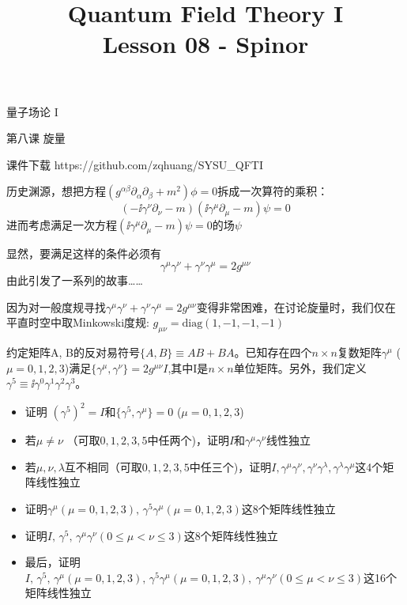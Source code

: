 \documentclass[CJK]{beamer}
\title{Quantum Field Theory I \\ Lesson 08 - Spinor}
\author{}
\date{}
\begin{document}
\begin{frame}
 
\begin{center}
\begin{Large}
\bch
量子场论 I 

{\vskip 0.3in}

第八课 旋量

\ech
\end{Large}
\end{center}

\vskip 0.2in

\bch
课件下载
\ech
https://github.com/zqhuang/SYSU\_QFTI

\end{frame}


\begin{frame}
\bch
历史渊源，想把方程$(g^{\alpha\beta}\partial_\alpha\partial_\beta + m^2)\phi = 0$拆成一次算符的乘积：
$$(-\ii\gamma^\nu\partial_\nu - m)(\ii \gamma^\mu\partial_\mu - m)\psi = 0$$
进而考虑满足一次方程$(\ii\gamma^\mu\partial_\mu - m)\psi = 0$的场$\psi$

\skipline
显然，要满足这样的条件必须有
$$\gamma^\mu\gamma^\nu + \gamma^\nu\gamma^\mu = 2g^{\mu\nu}$$
由此引发了一系列的故事……
\ech
\end{frame}


\begin{frame}
\bch
因为对一般度规寻找$\gamma^\mu\gamma^\nu + \gamma^\nu\gamma^\mu = 2g^{\mu\nu}$变得非常困难，在讨论旋量时，我们仅在平直时空中取Minkowski度规:
$g_{\mu\nu} = \mathrm{diag}(1, -1, -1, -1)$
\ech

\end{frame}

\begin{frame}
\bch

约定矩阵A, B的反对易符号$\{A, B\}\equiv AB + BA$。已知存在四个$n\times n$复数矩阵$\gamma^\mu$ ($\mu = 0, 1, 2, 3$)满足$\{\gamma^\mu,\gamma^\nu\} = 2g^{\mu\nu}I$,其中I是$n\times n $单位矩阵。另外，我们定义$\gamma^5\equiv \ii\gamma^0\gamma^1\gamma^2\gamma^3$。
\begin{itemize}
\item{证明 $(\gamma^5)^2 = I$和$\{\gamma^5,\gamma^\mu\} = 0$ ($\mu = 0,1,2,3$)}
\item{若$\mu\ne \nu$ （可取$0,1,2,3,5$中任两个)，证明$I$和$\gamma^\mu\gamma^\nu$线性独立}
\item{若$\mu,\nu,\lambda$互不相同（可取$0,1,2,3,5$中任三个)，证明$I,\gamma^\mu\gamma^\nu,\gamma^\nu\gamma^\lambda,\gamma^\lambda\gamma^\mu$这4个矩阵线性独立}
\item{证明$\gamma^\mu (\mu = 0,1,2,3),\, \gamma^5\gamma^\mu (\mu = 0,1,2,3)$这8个矩阵线性独立}
\item{证明$I,\, \gamma^5,\,  \gamma^\mu\gamma^\nu (0\le \mu<\nu\le 3)$这8个矩阵线性独立}
\item{最后，证明 $I,\, \gamma^5,\, \gamma^\mu(\mu=0,1,2,3),\, \gamma^5\gamma^\mu(\mu=0,1,2,3),\ \gamma^\mu\gamma^\nu (0\le \mu<\nu\le 3)$这16个矩阵线性独立}
\end{itemize}

\ech
\end{frame}
\end{document}
